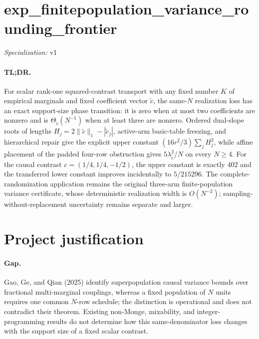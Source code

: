\documentclass{article}
\begin{document}
\sloppy

\section*{exp\_\allowbreak{}finitepopulation\_\allowbreak{}variance\_\allowbreak{}rounding\_\allowbreak{}frontier}

\noindent\textit{Specialization:} v1\par

\paragraph{TL;DR.} For scalar rank-one squared-contrast transport with any fixed number \(K\) of empirical marginals and fixed coefficient vector \(\widetilde c\), the same-\(N\) realization loss has an exact support-size phase transition: it is zero when at most two coefficients are nonzero and is \(\Theta_{\widetilde c}(N^{-1})\) when at least three are nonzero.  Ordered dual-slope roots of lengths \(H_j=2\|\widetilde c\|_1-|\widetilde c_j|\), active-arm basic-table freezing, and hierarchical repair give the explicit upper constant \((16r^2/3)\sum_jH_j^2\), while affine placement of the padded four-row obstruction gives \(5\lambda_{\widetilde c}^2/N\) on every \(N\ge4\).  For the causal contrast \(c=(1/4,1/4,-1/2)\), the upper constant is exactly \(402\) and the transferred lower constant improves incidentally to \(5/215296\).  The complete-randomization application remains the original three-arm finite-population variance certificate, whose deterministic realization width is \(O(N^{-2})\); sampling-without-replacement uncertainty remains separate and larger.

\section{Project justification}

\paragraph{Gap.} Gao, Ge, and Qian (2025) identify superpopulation causal variance bounds over fractional multi-marginal couplings, whereas a fixed population of \(N\) units requires one common \(N\)-row schedule; the distinction is operational and does not contradict their theorem.  Existing non-Monge, mixability, and integer-programming results do not determine how this same-denominator loss changes with the support size of a fixed scalar contrast.
\end{document}
